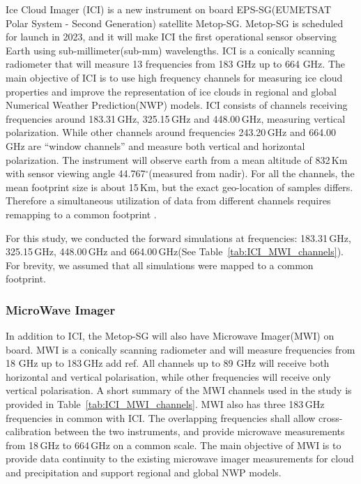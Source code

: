 \documentclass[amt, manuscript]{copernicus}
\newcommand{\todo}[1]{{\color{red} #1}}
\begin{document}
Ice Cloud Imager (ICI) is a new instrument on board EPS-SG(EUMETSAT Polar System - Second Generation) satellite Metop-SG. Metop-SG is scheduled for launch in 2023, and it will make ICI the first operational sensor observing Earth using sub-millimeter(sub-mm) wavelengths. ICI is a conically scanning radiometer that will measure 13 frequencies from 183 GHz up to 664 GHz. The main objective of ICI is to use high frequency channels for measuring ice cloud properties and improve the representation of ice clouds in regional and global Numerical Weather Prediction(NWP) models. ICI consists of channels receiving frequencies around 183.31\,GHz, 325.15\,GHz and 448.00\,GHz, measuring vertical polarization. While other channels around frequencies 243.20\,GHz and 664.00\,GHz are ``window channels'' and measure both vertical and horizontal polarization. The instrument will observe earth from a mean altitude of 832\,Km with sensor viewing angle 44.767$^\circ$(measured from nadir). For all the channels, the mean footprint size is about 15\,Km, but the exact geo-location of samples differs. Therefore a simultaneous utilization of data from different channels requires remapping to a common footprint \citep{eriksson:towar:20}.

For this study, we conducted the forward simulations at frequencies: 183.31\,GHz, 325.15\,GHz, 448.00\,GHz and 664.00\,GHz(See Table~\ref{tab:ICI_MWI_channels}). For brevity, we assumed that all simulations were mapped to a common footprint.

\subsubsection{MicroWave Imager}
%
\label{mwi_channels}
In addition to ICI, the Metop-SG will also have Microwave Imager(MWI) on board. MWI is a conically scanning radiometer and will measure frequencies from 18 GHz up to 183\,GHz \todo{add ref}. All channels up to 89 GHz will receive both horizontal and vertical polarisation, while other frequencies will receive only vertical polarisation. A short summary of the MWI channels used in the study is provided in Table~\ref{tab:ICI_MWI_channels}. MWI also has three  183\,GHz frequencies in common with ICI. The overlapping frequencies shall allow cross-calibration between the two instruments, and provide microwave measurements from 18\,GHz to 664\,GHz on a common scale. The main objective of MWI is to provide data continuity to the existing microwave imager measurements for cloud and precipitation and support regional and global NWP models.
\end{document}
